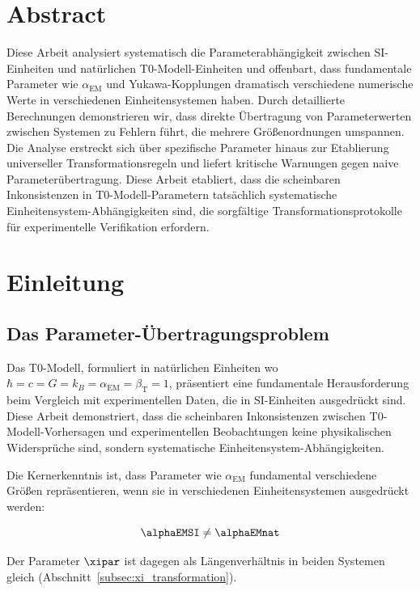 \section*{Abstract}
		Diese Arbeit analysiert systematisch die Parameterabhängigkeit zwischen SI-Einheiten und natürlichen T0-Modell-Einheiten und offenbart, dass fundamentale Parameter wie $\alpha_{\text{EM}}$ und Yukawa-Kopplungen dramatisch verschiedene numerische Werte in verschiedenen Einheitensystemen haben. Durch detaillierte Berechnungen demonstrieren wir, dass direkte Übertragung von Parameterwerten zwischen Systemen zu Fehlern führt, die mehrere Größenordnungen umspannen. Die Analyse erstreckt sich über spezifische Parameter hinaus zur Etablierung universeller Transformationsregeln und liefert kritische Warnungen gegen naive Parameterübertragung. Diese Arbeit etabliert, dass die scheinbaren Inkonsistenzen in T0-Modell-Parametern tatsächlich systematische Einheitensystem-Abhängigkeiten sind, die sorgfältige Transformationsprotokolle für experimentelle Verifikation erfordern.

	
	
	\section{Einleitung}
	\label{sec:einleitung}
	
	\subsection{Das Parameter-Übertragungsproblem}
	\label{subsec:parameter_problem}
	
	Das T0-Modell, formuliert in natürlichen Einheiten wo $\hbar = c = G = k_B = \alpha_{\text{EM}} = \beta_{\text{T}} = 1$, präsentiert eine fundamentale Herausforderung beim Vergleich mit experimentellen Daten, die in SI-Einheiten ausgedrückt sind. Diese Arbeit demonstriert, dass die scheinbaren Inkonsistenzen zwischen T0-Modell-Vorhersagen und experimentellen Beobachtungen keine physikalischen Widersprüche sind, sondern systematische Einheitensystem-Abhängigkeiten.
	
	Die Kernerkenntnis ist, dass Parameter wie $\alpha_{\text{EM}}$ fundamental verschiedene Größen repräsentieren, wenn sie in verschiedenen Einheitensystemen ausgedrückt werden:
	
	$$\alphaEMSI \neq \alphaEMnat$$
	
	Der Parameter $\xipar$ ist dagegen als Längenverhältnis in beiden Systemen gleich (Abschnitt~\ref{subsec:xi_transformation}).
	
